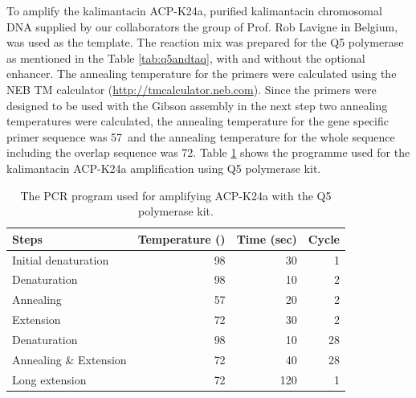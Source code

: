 		To amplify the kalimantacin ACP-K24a, purified kalimantacin chromosomal DNA supplied by our collaborators the group of Prof. Rob Lavigne in Belgium, was used as the template. The reaction mix was prepared for the Q5 polymerase as mentioned in the Table \ref{tab:q5andtaq}, with and without the optional enhancer. The annealing temperature for the primers were calculated using the NEB TM calculator (\url{http://tmcalculator.neb.com}). Since the primers were designed to be used with the Gibson assembly in the next step two annealing temperatures were calculated, the annealing temperature for the gene specific primer sequence was 57\textcelsius \ and the annealing temperature for the whole sequence including the overlap sequence was 72\textcelsius. Table \ref{tab:k24apcr} shows the programme used for the kalimantacin ACP-K24a amplification using Q5 polymerase kit.
		
		\begin{table}[htbp]
		\caption{The PCR program used for amplifying ACP-K24a with the Q5 polymerase kit.}
		\label{tab:k24apcr}
		\begin{center}
		\begin{tabular}{lrrr}
			\toprule[2pt]
			\textbf{Steps}         & \multicolumn{1}{l}{\textbf{Temperature (\textcelsius)}} & \multicolumn{1}{l}{\textbf{Time (sec)}} & \multicolumn{1}{l}{\textbf{Cycle}} \\ \midrule[1pt]
			Initial denaturation   &                                       98 &                                      30 &                                  1 \\
			Denaturation           &                                       98 &                                      10 &                                  2 \\
			Annealing              &                                       57 &                                      20 &                                  2 \\
			Extension              &                                       72 &                                      30 &                                  2 \\
			Denaturation           &                                       98 &                                      10 &                                 28 \\
			Annealing \& Extension &                                       72 &                                      40 &                                 28 \\
			Long extension         &                                       72 &                                     120 &                                  1 \\ \bottomrule[2pt]
		\end{tabular}
		\end{center}
		\end{table}
		
